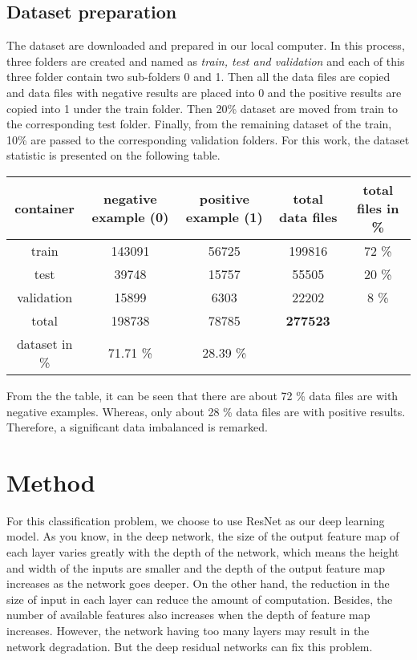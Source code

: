 \documentclass[10 pt]{report}
\begin{document}
\subsection*{Dataset preparation} The dataset are downloaded and prepared in our local computer. In this process, three folders are created and named as \textit{train, test and validation} and each of this three folder contain two sub-folders 0 and 1. Then all the data files are copied and data files with negative results are placed into 0  and the positive results are copied into 1 under the train folder. Then 20\% dataset are moved from train to the corresponding test folder. Finally, from the remaining dataset of the train, 10\% are passed to the corresponding validation folders. For this work, the dataset statistic is presented on the following table.

 
\begin{center}
\begin{tabular}{|c|c|c|c|c|}
\hline
container & negative example (0) & positive example (1) & total data files & total files in \%\\ \hline
train &  143091 & 56725   & 199816  &72 \% \\ \hline
test &  39748 &  15757 & 55505 & 20 \% \\ \hline
validation &  15899 &  6303 & 22202  & 8 \% \\ \hline
total &  198738 &  78785 & \textbf{277523}  & \\ \hline
dataset in  \% &  71.71 \% &  28.39 \% &   & \\ \hline
\end{tabular}
\end{center}
From the the table, it can be seen that there are about 72 \% data files are with negative examples. Whereas, only about 28 \% data files are with positive results. Therefore, a significant data imbalanced is remarked.




\section*{Method}
For this classification problem, we choose to use ResNet as our deep learning model. As you know, in the deep network, the size of the output feature map of each layer varies greatly with the depth of the network, which means the height and width of the inputs are smaller and the depth of the output feature map increases as the network goes deeper. On the other hand, the reduction in the size of input in each layer can reduce the amount of computation. Besides, the number of available features also increases when the depth of feature map increases. However, the network having too many layers may result in the network degradation. But the deep residual networks can fix this problem. 
\end{document}
